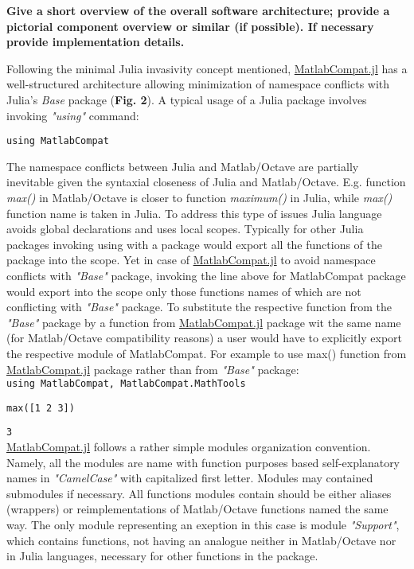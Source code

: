 \textbf{Give a short overview of the overall software architecture; provide a pictorial component overview or similar (if possible). If necessary provide implementation details.}

Following the minimal Julia invasivity concept mentioned, \href{https://github.com/MatlabCompat/MatlabCompat.jl}{MatlabCompat.jl} has a well-structured architecture allowing minimization of namespace conflicts with Julia's \textit{Base} package (\textbf{Fig. 2}). A typical usage of a Julia package involves invoking \textit{"using"} command:

\verb|using MatlabCompat|

The namespace conflicts between Julia and Matlab/Octave are partially inevitable given the syntaxial closeness of Julia and Matlab/Octave. E.g. function \textit{max()} in Matlab/Octave is closer to function \textit{maximum()} in Julia, while \textit{max()} function name is taken in Julia. To address this type of issues Julia language avoids global declarations and uses local scopes. Typically for other Julia packages invoking using with a package would export all the functions of the package into the scope. Yet in case of \href{https://github.com/MatlabCompat/MatlabCompat.jl}{MatlabCompat.jl} to avoid namespace conflicts with \textit{"Base"} package, invoking the line above for MatlabCompat package would export into the scope only those functions names of which are not conflicting with \textit{"Base"} package. To substitute the respective function from the \textit{"Base"} package by a function from \href{https://github.com/MatlabCompat/MatlabCompat.jl}{MatlabCompat.jl} package wit the same name (for Matlab/Octave compatibility reasons) a user would have to explicitly export the respective module of MatlabCompat. For example to use max() function from \href{https://github.com/MatlabCompat/MatlabCompat.jl}{MatlabCompat.jl} package rather than from \textit{"Base"} package:\\

\verb|using MatlabCompat, MatlabCompat.MathTools|

\verb|max([1 2 3])|

\verb|3|\\


\href{https://github.com/MatlabCompat/MatlabCompat.jl}{MatlabCompat.jl} follows a rather simple modules organization convention. Namely, all the modules are name with function purposes based self-explanatory names in \textit{"CamelCase"} with capitalized first letter. Modules may contained submodules if necessary. All functions modules contain should be either aliases (wrappers) or reimplementations of Matlab/Octave functions named the same way. The only module representing an exeption in this case is module \textit{"Support"}, which contains functions, not having an analogue neither in Matlab/Octave nor in Julia languages, necessary for other functions in the package.

